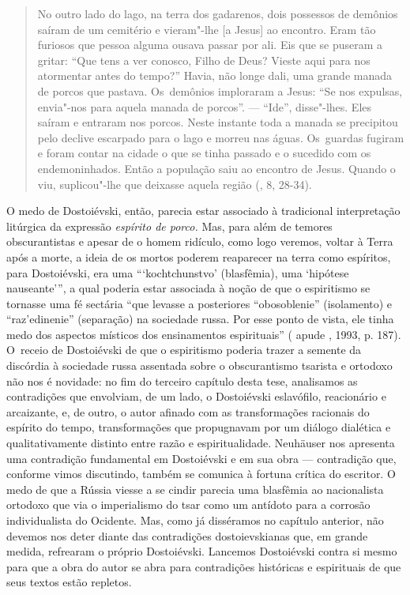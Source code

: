 \begin{quote}
No outro lado do lago, na terra dos gadarenos, dois possessos de
demônios saíram de um cemitério e vieram"-lhe {[}a Jesus{]} ao encontro.
Eram tão furiosos que pessoa alguma ousava passar por ali. Eis que se
puseram a gritar: ``Que tens a ver conosco, Filho de Deus? Vieste aqui
para nos atormentar antes do tempo?'' Havia, não longe dali, uma grande
manada de porcos que pastava. Os~demônios imploraram a Jesus: ``Se nos
expulsas, envia"-nos para aquela manada de porcos''. --- ``Ide'',
disse"-lhes. Eles saíram e entraram nos porcos. Neste instante toda a
manada se precipitou pelo declive escarpado para o lago e morreu nas
águas. Os~guardas fugiram e foram contar na cidade o que se tinha
passado e o sucedido com os endemoninhados. Então a população saiu ao
encontro de Jesus. Quando o viu, suplicou"-lhe que deixasse aquela região
(, 8, 28-34).
\end{quote}

O medo de Dostoiévski, então, parecia estar associado à tradicional
interpretação litúrgica da expressão \emph{espírito de porco.} Mas, para
além de temores obscurantistas e apesar de o homem ridículo, como logo
veremos, voltar à Terra após a morte, a ideia de os mortos poderem
reaparecer na terra como espíritos, para Dostoiévski, era uma
```kochtchunstvo' (blasfêmia), uma `hipótese nauseante''', a qual
poderia estar associada à noção de que o espiritismo se tornasse uma fé
sectária ``que levasse a posteriores ``obosoblenie'' (isolamento) e
``raz'edinenie'' (separação) na sociedade russa. Por esse ponto de
vista, ele tinha medo dos aspectos místicos dos ensinamentos
espirituais'' ( apude , 1993, p. 187). O~receio de
Dostoiévski de que o espiritismo poderia trazer a semente da discórdia à
sociedade russa assentada sobre o obscurantismo tsarista e ortodoxo não
nos é novidade: no fim do terceiro capítulo desta tese, analisamos as
contradições que envolviam, de um lado, o Dostoiévski eslavófilo,
reacionário e arcaizante, e, de outro, o autor afinado com as
transformações racionais do espírito do tempo, transformações que
propugnavam por um diálogo dialética e qualitativamente distinto entre
razão e espiritualidade. Neuhäuser nos apresenta uma contradição
fundamental em Dostoiévski e em sua obra --- contradição que, conforme
vimos discutindo, também se comunica à fortuna crítica do escritor. O
medo de que a Rússia viesse a se cindir parecia uma blasfêmia ao
nacionalista ortodoxo que via o imperialismo do tsar como um antídoto
para a corrosão individualista do Ocidente. Mas, como já disséramos no
capítulo anterior, não devemos nos deter diante das contradições
dostoievskianas que, em grande medida, refrearam o próprio Dostoiévski.
Lancemos Dostoiévski contra si mesmo para que a obra do autor se abra
para contradições históricas e espirituais de que seus textos estão
repletos.

